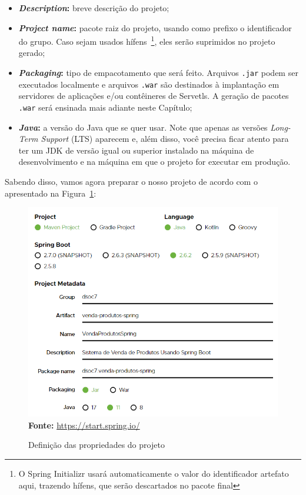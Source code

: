 \begin{itemize}
\begin{itemize}
        \item \textbf{\textit{Description}:} breve descrição do projeto;
        
        \item \textbf{\textit{Project name}:} pacote raiz do projeto, usando como prefixo o identificador do grupo. Caso sejam usados hífens~\footnote{O Spring Initializr usará automaticamente o valor do identificador artefato aqui, trazendo hífens, que serão descartados no pacote final}, eles serão suprimidos no projeto gerado;
        
        \item \textbf{\textit{Packaging}:} tipo de empacotamento que será feito. Arquivos \texttt{.jar} podem ser executados localmente e arquivos \texttt{.war} são destinados à implantação em servidores de aplicações e/ou contêineres de Servetls. A geração de pacotes \texttt{.war} será ensinada mais adiante neste Capítulo;
        
        \item \textbf{\textit{Java}:} a versão do Java que se quer usar. Note que apenas as versões \textit{Long-Term Support} (LTS) aparecem e, além disso, você precisa ficar atento para ter um JDK de versão igual ou superior instalado na máquina de desenvolvimento e na máquina em que o projeto for executar em produção.
        
    \end{itemize}
\end{itemize}

Sabendo disso, vamos agora preparar o nosso projeto de acordo com o apresentado na Figura~\ref{fig:cap10SpringInitializrConfProjeto01}:

\FloatBarrier
\begin{figure}[!htbp]
    \centering
    \caption{Definição das propriedades do projeto}
    \includegraphics[scale=0.7]{imagens/cap10SpringInitializrConfProjeto01}
    \\\textbf{Fonte:} \url{https://start.spring.io/}
    \label{fig:cap10SpringInitializrConfProjeto01}
\end{figure}
\FloatBarrier

